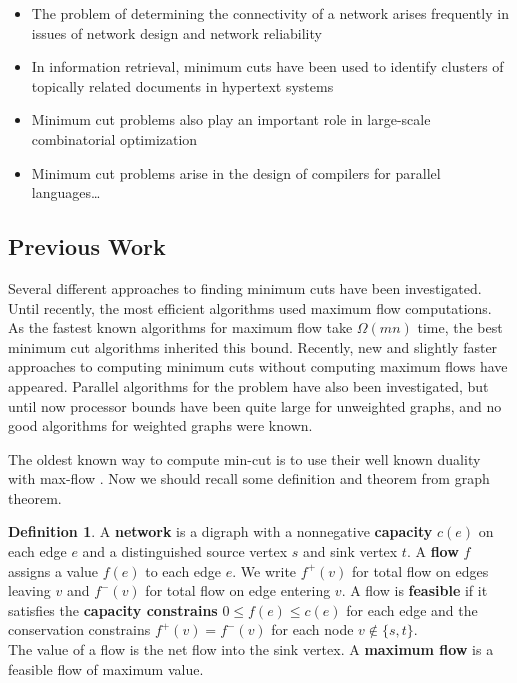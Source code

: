 \documentclass[11pt]{article}
\theoremstyle{plain}
\theoremstyle{definition}
\newtheorem{defn}[thm]{Definition}
\theoremstyle{remark}
\begin{document}
\begin{itemize}
  \item The problem of determining the connectivity of a network arises frequently in issues of network design and network reliability
  \item In information retrieval, minimum cuts have been used to identify clusters of topically related documents in hypertext systems
  \item Minimum cut problems also play an important role in large-scale combinatorial optimization
  \item Minimum cut problems arise in the design of compilers for parallel languages\ldots
\end{itemize}

\subsection{Previous Work}
Several different approaches to finding minimum cuts have been investigated. Until recently, the most efficient algorithms used maximum flow computations. As the fastest known algorithms for maximum flow take $ \Omega(mn) $ time, the best minimum cut algorithms inherited this bound. Recently, new and slightly faster approaches to computing minimum cuts without computing maximum flows have appeared. Parallel algorithms for the problem have also been investigated, but until now processor bounds have been quite large for unweighted graphs, and no good algorithms for weighted graphs were known.

The oldest known way to compute min-cut is to use their well known duality with max-flow \cite{ford1956maximal}. Now we should recall some definition and theorem from graph theorem.

\begin{defn}
A \textbf{network} is a digraph with a nonnegative \textbf{capacity} $ c(e) $ on each edge $ e $ and a distinguished source vertex $ s $ and sink vertex $ t $. A \textbf{flow} $ f $ assigns a value $ f(e) $ to each edge $ e $. We write $ f^+(v) $ for total flow on edges leaving $ v $ and $ f^-(v) $ for total flow on edge entering $ v $.  A flow is \textbf{feasible} if it satisfies the \textbf{capacity constrains} $ 0\leq f(e)\leq c(e) $ for each edge and the conservation constrains $ f^+(v)=f^-(v) $ for each node $ v\not\in \{s,t\} $.\\
The value of a flow is the net flow into the sink vertex.
A  \textbf{maximum flow}  is a feasible flow of maximum value.
\end{defn}
\end{document}
